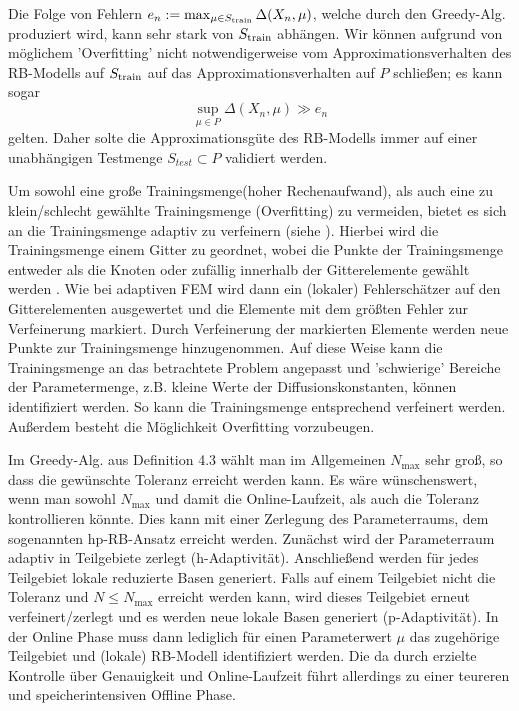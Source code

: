 Die Folge von Fehlern $e_n := \max_{\mu\in S_{\operatorname{train}}}\Delta(X_n,\mu)$, welche durch den Greedy-Alg. produziert wird, kann sehr stark von $S_{\operatorname{train}}$ abhängen.
Wir können aufgrund von möglichem 'Overfitting' nicht notwendigerweise vom Approximationsverhalten des RB-Modells auf $S_{\operatorname{train}}$ auf das Approximationsverhalten auf $P$ schließen; es kann sogar 
\[
\sup\limits_{\mu\in P} \Delta(X_n,\mu) \gg e_n
\]
gelten.
Daher solte die Approximationsgüte des RB-Modells immer auf einer unabhängigen Testmenge $S_{test}\subset P$ validiert werden.

Um sowohl eine große Trainingsmenge(hoher Rechenaufwand), als auch eine zu klein/schlecht gewählte Trainingsmenge (Overfitting) zu vermeiden, bietet es sich an die Trainingsmenge adaptiv zu verfeinern (siehe 
\cite{HaaDihOhl2011,HaaOhl2008b}). Hierbei wird die Trainingsmenge einem Gitter zu geordnet, wobei die Punkte der Trainingsmenge entweder als die Knoten \cite{HaaOhl2008b} oder zufällig innerhalb der Gitterelemente gewählt werden \cite{EftPatRon2010}.
Wie bei adaptiven FEM wird dann ein (lokaler) Fehlerschätzer auf den Gitterelementen ausgewertet und die Elemente mit dem größten Fehler zur Verfeinerung markiert.
Durch Verfeinerung der markierten Elemente werden neue Punkte zur Trainingsmenge hinzugenommen.
Auf diese Weise kann die Trainingsmenge an das betrachtete Problem angepasst und 'schwierige' Bereiche der Parametermenge, z.B. kleine Werte der Diffusionskonstanten, können identifiziert werden.
So kann die Trainingsmenge entsprechend verfeinert werden.
Außerdem besteht die Möglichkeit Overfitting vorzubeugen.

Im Greedy-Alg. aus Definition 4.3 wählt man im Allgemeinen $N_{\max}$ sehr groß, so dass die gewünschte Toleranz erreicht werden kann.
Es wäre wünschenswert, wenn man sowohl $N_{\max}$ und damit die Online-Laufzeit, als auch die Toleranz kontrollieren könnte.
Dies kann mit einer Zerlegung des Parameterraums, dem sogenannten hp-RB-Ansatz \cite{EftPatRon2010} erreicht werden.
Zunächst wird der Parameterraum adaptiv in Teilgebiete zerlegt (h-Adaptivität).
Anschließend werden für jedes Teilgebiet lokale reduzierte Basen generiert.
Falls auf einem Teilgebiet nicht die Toleranz und $N\le N_{\max}$ erreicht werden kann, wird dieses Teilgebiet erneut verfeinert/zerlegt und es werden neue lokale Basen generiert (p-Adaptivität).
In der Online Phase muss dann lediglich für einen Parameterwert $\mu$ das zugehörige Teilgebiet und (lokale) RB-Modell identifiziert werden.
Die da durch erzielte Kontrolle über Genauigkeit und Online-Laufzeit führt allerdings zu einer teureren und speicherintensiven Offline Phase.

